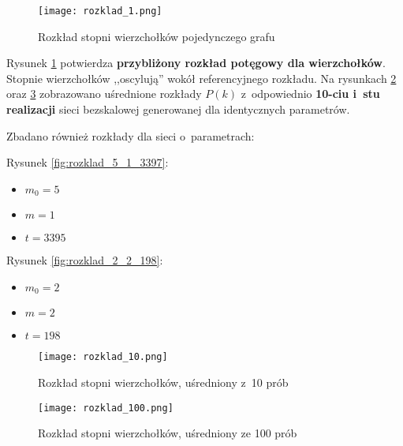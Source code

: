 \begin{enumerate}
\begin{figure}[H]
\centering
\texttt{[image: rozklad\_1.png]}
\caption{\small Rozkład stopni wierzchołków pojedynczego grafu}
\label{fig:rozklad_1}
\end{figure}


Rysunek \ref{fig:rozklad_1} potwierdza \textbf{przybliżony rozkład potęgowy dla wierzchołków}. Stopnie wierzchołków ,,oscylują'' wokół referencyjnego rozkładu. Na rysunkach \ref{fig:rozklad_10}  oraz 
\ref{fig:rozklad_100}  zobrazowano uśrednione rozkłady $P(k)$ z~odpowiednio \textbf{10-ciu i~stu realizacji} sieci bezskalowej generowanej dla identycznych parametrów.

Zbadano również rozkłady dla sieci o~parametrach:

\noindent
\begin{minipage}[H]{0.45\textwidth}
\centering
Rysunek \ref{fig:rozklad_5_1_3397}:
\begin{itemize}[nolistsep]
\item $m_0 = 5$
\item $m = 1$
\item $t = 3395$
\end{itemize}
\end{minipage}
\begin{minipage}[H]{0.45\textwidth}
\centering
Rysunek \ref{fig:rozklad_2_2_198}:
\begin{itemize}[nolistsep]
\item $m_0 = 2$
\item $m = 2$
\item $t = 198$
\end{itemize}
\end{minipage}




\begin{figure}[H]
\centering
\texttt{[image: rozklad\_10.png]}
\caption{\small Rozkład stopni wierzchołków, uśredniony z~10 prób}
\label{fig:rozklad_10}
\end{figure}

\begin{figure}[H]
\centering
\texttt{[image: rozklad\_100.png]}
\caption{\small Rozkład stopni wierzchołków, uśredniony ze 100 prób}
\label{fig:rozklad_100}
\end{figure}


\end{enumerate}
